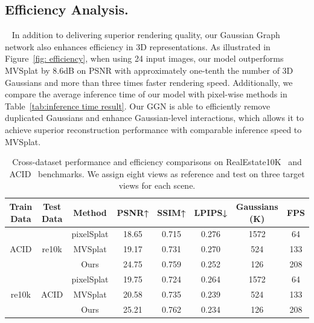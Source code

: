 \subsection{Efficiency Analysis.}~\label{sec:efficiency exp}
In addition to delivering superior rendering quality, our Gaussian Graph network also enhances efficiency in 3D representations. As illustrated in Figure~\ref{fig: efficiency}, when using 24 input images, our model outperforms MVSplat by 8.6dB on PSNR with approximately one-tenth the number of 3D Gaussians and more than three times faster rendering speed. Additionally, we compare the average inference time of our model with pixel-wise methods in Table~\ref{tab:inference time result}. Our GGN is able to efficiently remove duplicated Gaussians and enhance Gaussian-level interactions, which allows it to achieve superior reconstruction performance with comparable inference speed to MVSplat. 






\begin{table}[t]
    \centering
    \caption{Cross-dataset performance and efficiency comparisons on RealEstate10K~\cite{RealEstate10K2018} and ACID~\cite{ACID2021ICCV} benchmarks. We assign eight views as reference and test on three target views for each scene.}
    \vspace{0.2cm}
    \begin{tabular}{cc|cccccc}
        \toprule
        Train Data& Test Data & Method & PSNR↑ & SSIM↑ & LPIPS↓ & Gaussians (K)& FPS \\
        \midrule
        \multirow{3}{*}{ACID}& \multirow{3}{*}{re10k}& pixelSplat & 18.65 & 0.715 & 0.276 & 1572 & 64 \\
        & & MVSplat & 19.17 & 0.731 & 0.270 & 524 & 133 \\
        & & Ours & 24.75 & 0.759 & 0.252 & 126 & 208 \\
        \cmidrule{1-8}
        \multirow{3}{*}{re10k}& \multirow{3}{*}{ACID}& pixelSplat & 19.75 & 0.724 & 0.264 & 1572 & 64 \\
        & & MVSplat & 20.58 & 0.735 & 0.239 & 524 & 133 \\
        & & Ours & 25.21 & 0.762 & 0.234 & 126 & 208 \\
        \bottomrule
    \end{tabular}
    \label{tab:cross_dataset}
    \vspace{-0.4cm}
\end{table}

